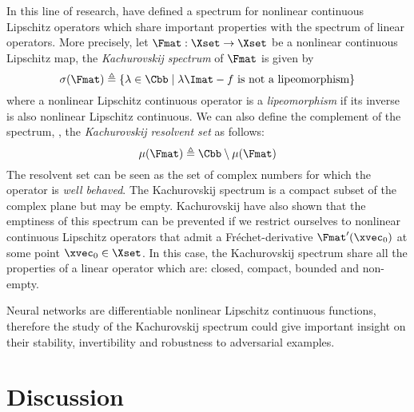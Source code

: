 In this line of research, \citet{kachurovskii1969regular} have defined a spectrum for nonlinear continuous Lipschitz operators which share important properties with the spectrum of linear operators.
More precisely, let $\Fmat: \Xset \rightarrow \Xset$ be a nonlinear continuous Lipschitz map, the \emph{Kachurovskij spectrum} of $\Fmat$ is given by
\begin{equation}
  \sigma(\Fmat) \triangleq \left\{ \lambda \in \Cbb \mid \lambda \Imat - f \text{ is not a lipeomorphism} \right\} 
\end{equation} 
where a nonlinear Lipschitz continuous operator is a \emph{lipeomorphism} if its inverse is also nonlinear Lipschitz continuous.
We can also define the complement of the spectrum, \ie, the \emph{Kachurovskij resolvent set} as follows: 
\begin{equation}
  \mu(\Fmat) \triangleq \Cbb \setminus \mu(\Fmat) 
\end{equation}
The resolvent set can be seen as the set of complex numbers for which the operator is \emph{well behaved}.
The Kachurovskij spectrum is a compact subset of the complex plane but may be empty.
Kachurovskij have also shown that the emptiness of this spectrum can be prevented if we restrict ourselves to nonlinear continuous Lipschitz operators that admit a Fréchet-derivative $\Fmat'(\xvec_0)$ at some point $\xvec_0 \in \Xset$.
In this case, the Kachurovskij spectrum share all the properties of a linear operator which are: closed, compact, bounded and non-empty. 

Neural networks are differentiable nonlinear Lipschitz continuous functions, therefore the study of the Kachurovskij spectrum could give important insight on their stability, invertibility and robustness to adversarial examples.



\section{Discussion}
\label{section:ch6-discussion}




